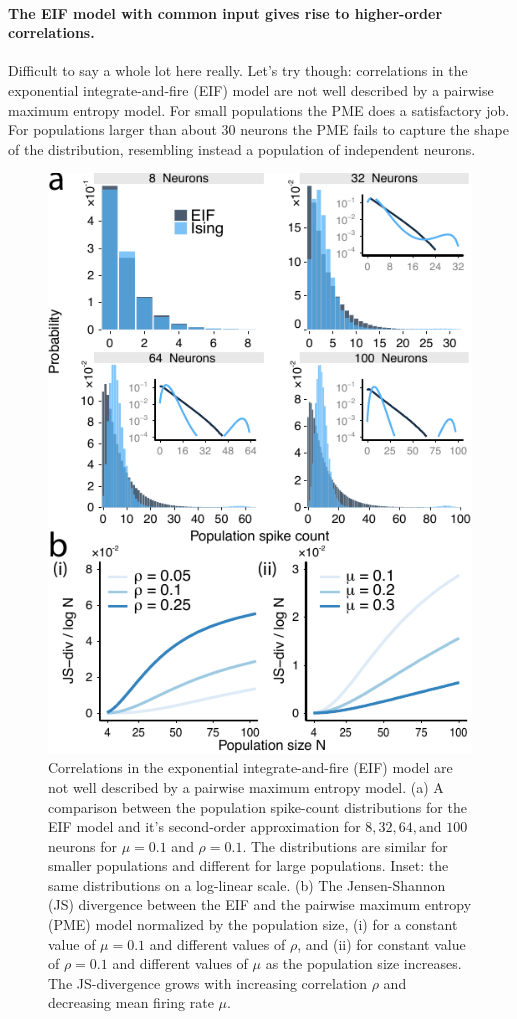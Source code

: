 \documentclass[%
 reprint,
 amsmath,amssymb,
 aps,
floatfix,
]{revtex4-1}
\begin{document}
\paragraph*{The EIF model with common input gives rise to higher-order correlations.}
Difficult to say a whole lot here really. Let's try though: correlations in the exponential integrate-and-fire (EIF) model are not well described by a pairwise maximum entropy model. For small populations the PME does a satisfactory job. For populations larger than about $30$ neurons the PME fails to capture the shape of the distribution, resembling instead a population of independent neurons.
\begin{figure}[h]
\includegraphics{../R/fig_2/fig_2a_test.pdf}
\caption{\label{fig:eifising}Correlations in the exponential integrate-and-fire (EIF) model are not well described by a pairwise maximum entropy model. (a) A comparison between the population spike-count distributions for the EIF model and it's second-order approximation for $8, 32, 64, \text{and } 100$ neurons for $\mu = 0.1$ and $\rho = 0.1$. The distributions are similar for smaller populations and different for large populations. Inset: the same distributions on a log-linear scale. (b) The Jensen-Shannon (JS) divergence between the EIF and the pairwise maximum entropy (PME) model normalized by the population size, (i) for a constant value of $\mu = 0.1$ and different values of $\rho$, and (ii) for constant value of $\rho = 0.1$ and different values of $\mu$ as the population size increases. The JS-divergence grows with increasing correlation $\rho$ and decreasing mean firing rate $\mu$.}
\end{figure}
\end{document}
